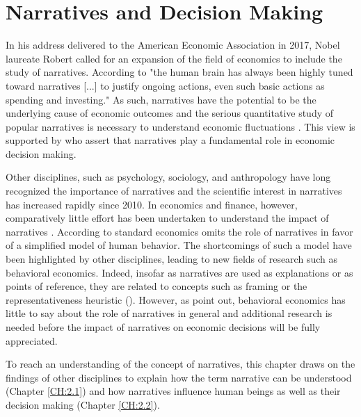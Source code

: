 \documentclass[11pt,a4paper,english,oneside]{book}
\numberwithin{equation}{chapter}
\begin{document}
\chapter{Narratives and Decision Making}\label{NarrativesAndDecisionMaking}

In his address delivered to the American Economic Association in 2017, Nobel laureate Robert \citeauthor{Shiller.2017} called for an expansion of the field of economics to include the study of narratives. According to \citet[p. 967]{Shiller.2017} "the human brain has always been highly tuned
toward narratives [...] to justify ongoing actions, even such basic actions as spending and investing." As such, narratives have the potential to be the underlying cause of economic outcomes and the serious quantitative study of popular narratives is necessary to understand economic fluctuations \cite[p. 967]{Shiller.2017}. This view is supported by \citet{Akerlof.2016} who assert that narratives play a fundamental role in economic decision making.

Other disciplines, such as psychology, sociology, and anthropology have long recognized the importance of narratives and the scientific interest in narratives has increased rapidly since 2010. In economics and finance, however, comparatively little effort has been undertaken to understand the impact of narratives \cite[pp. 970--97]{Shiller.2017}. According to \citet[p. 59]{Akerlof.2016} standard economics omits the role of narratives in favor of a simplified model of human behavior. The shortcomings of such a model have been highlighted by other disciplines, leading to new fields of research such as behavioral economics. Indeed, insofar as narratives are used as explanations or as points of reference, they are related to concepts such as framing or the representativeness heuristic (\citealp{Kahnemann.1974,Kahneman.2002,Thaler.2016}). However, as \citet[p. 59]{Akerlof.2016} point out, behavioral economics has little to say about the role of narratives in general and additional research is needed before the impact of narratives on economic decisions will be fully appreciated. 

To reach an understanding of the concept of narratives, this chapter draws on the findings of other disciplines to explain how the term narrative can be understood (Chapter \ref{CH:2.1}) and how narratives influence human beings as well as their decision making (Chapter \ref{CH:2.2}). 


\end{document}
